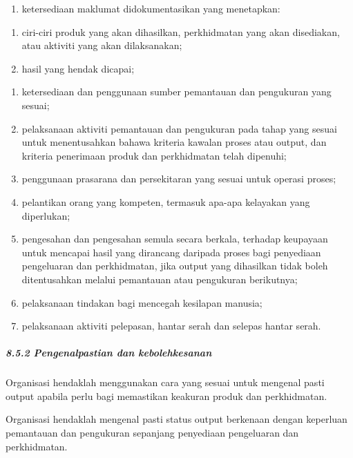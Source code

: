 \documentclass[
]{article}
\providecommand{\tightlist}{%
  \setlength{\itemsep}{0pt}\setlength{\parskip}{0pt}}
\begin{document}
\begin{enumerate}
\def\labelenumi{\alph{enumi})}
\tightlist
\item
  ketersediaan maklumat didokumentasikan yang menetapkan:
\end{enumerate}

\begin{enumerate}
\def\labelenumi{\arabic{enumi})}
\item
  ciri-ciri produk yang akan dihasilkan, perkhidmatan yang akan
  disediakan, atau aktiviti yang akan dilaksanakan;
\item
  hasil yang hendak dicapai;
\end{enumerate}

\begin{enumerate}
\def\labelenumi{\alph{enumi})}
\setcounter{enumi}{1}
\item
  ketersediaan dan penggunaan sumber pemantauan dan pengukuran yang
  sesuai;
\item
  pelaksanaan aktiviti pemantauan dan pengukuran pada tahap yang sesuai
  untuk menentusahkan bahawa kriteria kawalan proses atau output, dan
  kriteria penerimaan produk dan perkhidmatan telah dipenuhi;
\item
  penggunaan prasarana dan persekitaran yang sesuai untuk operasi
  proses;
\item
  pelantikan orang yang kompeten, termasuk apa-apa kelayakan yang
  diperlukan;
\item
  pengesahan dan pengesahan semula secara berkala, terhadap keupayaan
  untuk mencapai hasil yang dirancang daripada proses bagi penyediaan
  pengeluaran dan perkhidmatan, jika output yang dihasilkan tidak boleh
  ditentusahkan melalui pemantauan atau pengukuran berikutnya;
\item
  pelaksanaan tindakan bagi mencegah kesilapan manusia;
\item
  pelaksanaan aktiviti pelepasan, hantar serah dan selepas hantar serah.
\end{enumerate}

\hypertarget{pengenalpastian-dan-kebolehkesanan}{%
\subparagraph{8.5.2 Pengenalpastian dan
kebolehkesanan}\label{pengenalpastian-dan-kebolehkesanan}}

Organisasi hendaklah menggunakan cara yang sesuai untuk mengenal pasti
output apabila perlu bagi memastikan keakuran produk dan perkhidmatan.

Organisasi hendaklah mengenal pasti status output berkenaan dengan
keperluan pemantauan dan pengukuran sepanjang penyediaan pengeluaran dan
perkhidmatan.
\end{document}
